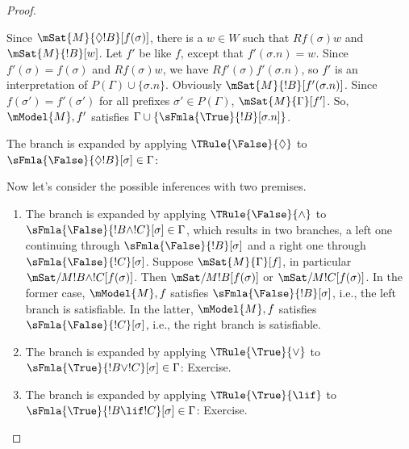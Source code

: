 \documentclass[../../../include/open-logic-section]{subfiles}
\begin{document}
\begin{proof}
\begin{enumerate}
{{  Since $\mSat{M}{\Diamond !B}[f(\sigma)]$, there is a $w \in W$ such that
  $Rf(\sigma)w$ and $\mSat{M}{!B}[w]$. Let $f'$ be like $f$, except
  that $f'(\sigma.n) = w$. Since $f'(\sigma) = f(\sigma)$ and
  $Rf(\sigma)w$, we have $Rf'(\sigma)f'(\sigma.n)$, so $f'$ is an
  interpretation of $P(\Gamma) \cup \{\sigma.n\}$.  Obviously
  $\mSat{M}{!B}[f'(\sigma.n)]$. Since $f(\sigma') = f'(\sigma')$ for
  all prefixes $\sigma' \in P(\Gamma)$, $\mSat{M}{\Gamma}[f']$.  So,
  $\mModel{M}, f'$ satisfies $\Gamma \cup
  \{\sFmla{\True}{!B}[\sigma.n]\}$.}
\item The branch is expanded by applying $\TRule{\False}{\Diamond}$ to
  $\sFmla{\False}{\Diamond !B}[\sigma] \in \Gamma$:
  }{}
\end{enumerate}
Now let's consider the possible inferences with two premises.
\begin{enumerate}
\item The branch is expanded by applying $\TRule{\False}{\land}$ to
  $\sFmla{\False}{!B \land !C}[\sigma] \in \Gamma$, which results in
  two branches, a left one continuing through
  $\sFmla{\False}{!B}[\sigma]$ and a right one through
  $\sFmla{\False}{!C}[\sigma]$. Suppose $\mSat{M}{\Gamma}[f]$, in
  particular $\mSat/{M}{!B \land !C}[f(\sigma)]$.  Then
  $\mSat/{M}{!B}[f(\sigma)]$ or $\mSat/{M}{!C}[f(\sigma)]$. In the
  former case, $\mModel{M}, f$ satisfies $\sFmla{\False}{!B}[\sigma]$,
  i.e., the left branch is satisfiable. In the latter, $\mModel{M}, f$
  satisfies $\sFmla{\False}{!C}[\sigma]$, i.e., the right branch is
  satisfiable.
\item The branch is expanded by applying $\TRule{\True}{\lor}$ to
    $\sFmla{\True}{!B \lor !C}[\sigma] \in \Gamma$: Exercise.
\item The branch is expanded by applying $\TRule{\True}{\lif}$ to
    $\sFmla{\True}{!B \lif !C}[\sigma] \in \Gamma$: Exercise.
\end{enumerate}
\end{proof}
\end{document}
